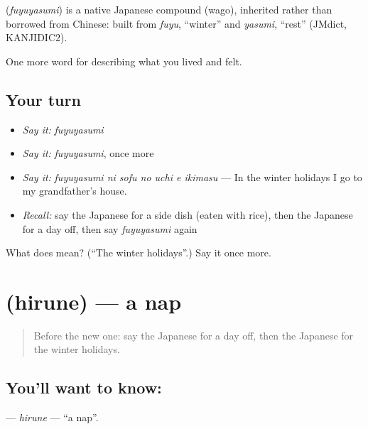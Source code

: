 \begin{cousinweb}
\textbf{} (\emph{fuyuyasumi}) is a native Japanese compound (wago), inherited rather than borrowed from Chinese: built from \emph{fuyu}, \textquotedblleft{}winter\textquotedblright{} and \emph{yasumi}, \textquotedblleft{}rest\textquotedblright{} (JMdict, KANJIDIC2).
\end{cousinweb}

\begin{grammarlens}[title={What you've built}]
One more word for describing what you lived and felt.
\end{grammarlens}

\subsection*{Your turn}
\begin{itemize}
\raggedright
  \item \emph{Say it:} \emph{fuyuyasumi}
  \item \emph{Say it:} \emph{fuyuyasumi}, once more
  \item \emph{Say it:} \emph{fuyuyasumi ni sofu no uchi e ikimasu} — In the winter holidays I go to my grandfather's house.
  \item \emph{Recall:} say the Japanese for a side dish (eaten with rice), then the Japanese for a day off, then say \emph{fuyuyasumi} again
\end{itemize}

\begin{tcolorbox}[breakable,colback=teal!4,colframe=teal!35!black,title={Before you move on}]
What does  mean? (\textquotedblleft{}The winter holidays\textquotedblright{}.) Say it once more.
\end{tcolorbox}
\section[\texorpdfstring{\ja{ひるね} (hirune)}{ひるね (hirune)}]{ (hirune) — a nap}

\label{lesson:JA-C498-hirune}



\begin{quote}
Before the new one: say the Japanese for a day off, then the Japanese for the winter holidays.
\end{quote}

\subsection*{You'll want to know: }
\textbf{} — \emph{hirune} — \textquotedblleft{}a nap\textquotedblright{}.

